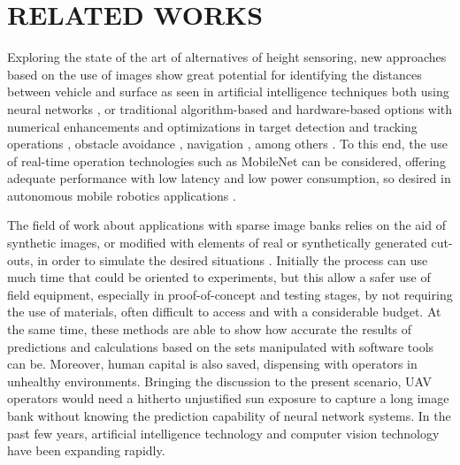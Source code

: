 \section{RELATED WORKS}
    Exploring the state of the art of alternatives of height sensoring, new approaches based on the use of images show great potential for identifying the distances between vehicle and surface as seen in artificial intelligence techniques both using neural networks \cite{MonocularDepth} \cite{Joglekar2011DepthEU}, or traditional algorithm-based and hardware-based options with numerical enhancements and optimizations in target detection and tracking operations \cite{SurveyObjDetectionTracking}, obstacle avoidance \cite{CNNSingleImageQuadrotor} \cite{AircraftColAvoid}, navigation \cite{ByMySelf}, among others \cite{OpticalFlowStereo}.
    To this end, the use of real-time operation technologies such as MobileNet can be considered, offering adequate performance with low latency and low power consumption, so desired in autonomous mobile robotics applications \cite{MobileNetTracking}.
    
    The field of work about applications with sparse image banks relies on the aid of synthetic images, or modified with elements of real or synthetically generated cut-outs, in order to simulate the desired situations \cite{BlenderSmoke} \cite{BlurFiducial} \cite{ObjetoSintetico} \cite{TurbineBlur} \cite{BlenderMapa}.
    Initially the process can use much time that could be oriented to experiments, but this allow a safer use of field equipment, especially in proof-of-concept and testing stages, by not requiring the use of materials, often difficult to access and with a considerable budget. 
    At the same time, these methods are able to show how accurate the results of predictions and calculations based on the sets manipulated with software tools can be. 
    Moreover, human capital is also saved, dispensing with operators in unhealthy environments. 
    Bringing the discussion to the present scenario, UAV operators would need a hitherto unjustified sun exposure to capture a long image bank without knowing the prediction capability of neural network systems. 
    In the past few years, artificial intelligence technology and computer vision technology have been expanding rapidly.
    
